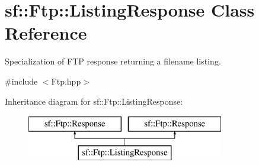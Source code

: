 \hypertarget{classsf_1_1_ftp_1_1_listing_response}{\section{sf\-:\-:Ftp\-:\-:Listing\-Response Class Reference}
\label{classsf_1_1_ftp_1_1_listing_response}
}


Specialization of F\-T\-P response returning a filename listing.  




{\ttfamily \#include $<$Ftp.\-hpp$>$}

Inheritance diagram for sf\-:\-:Ftp\-:\-:Listing\-Response\-:\begin{figure}[H]
\begin{center}
\leavevmode
\includegraphics[height=2.000000cm]{classsf_1_1_ftp_1_1_listing_response}
\end{center}
\end{figure}
